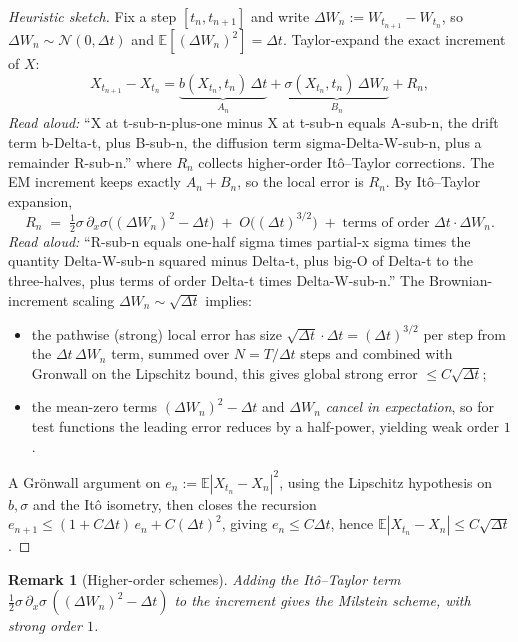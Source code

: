 \documentclass[11pt]{article}
\newtheorem{remark}{Remark}
\begin{document}
\begin{proof}[Heuristic sketch]
Fix a step $[t_n, t_{n+1}]$ and write $\Delta W_n := W_{t_{n+1}} - W_{t_n}$, so
$\Delta W_n \sim \mathcal{N}(0, \Delta t)$ and $\mathbb{E}[(\Delta W_n)^2] = \Delta t$.
Taylor-expand the exact increment of $X$:
\[
X_{t_{n+1}} - X_{t_n}
= \underbrace{b(X_{t_n}, t_n)\,\Delta t}_{A_n}
+ \underbrace{\sigma(X_{t_n}, t_n)\,\Delta W_n}_{B_n}
+ R_n,
\]
\emph{Read aloud:} ``X at t-sub-n-plus-one minus X at t-sub-n equals A-sub-n, the drift term b-Delta-t, plus B-sub-n, the diffusion term sigma-Delta-W-sub-n, plus a remainder R-sub-n.''
where $R_n$ collects higher-order It\^o--Taylor corrections. The EM increment
keeps exactly $A_n + B_n$, so the local error is $R_n$. By It\^o--Taylor expansion,
\[
R_n \;=\; \tfrac{1}{2}\sigma\,\partial_x\sigma \bigl((\Delta W_n)^2 - \Delta t\bigr)
\;+\; O\bigl((\Delta t)^{3/2}\bigr) \;+\; \text{terms of order } \Delta t \cdot \Delta W_n.
\]
\emph{Read aloud:} ``R-sub-n equals one-half sigma times partial-x sigma times the quantity Delta-W-sub-n squared minus Delta-t, plus big-O of Delta-t to the three-halves, plus terms of order Delta-t times Delta-W-sub-n.''
The Brownian-increment scaling $\Delta W_n \sim \sqrt{\Delta t}$ implies:
\begin{itemize}
\item the pathwise (strong) local error has size $\sqrt{\Delta t}\cdot\Delta t = (\Delta t)^{3/2}$
  per step from the $\Delta t\,\Delta W_n$ term, summed over $N = T/\Delta t$ steps and combined
  with Gronwall on the Lipschitz bound, this gives global strong error $\le C\sqrt{\Delta t}$;
\item the mean-zero terms $(\Delta W_n)^2 - \Delta t$ and $\Delta W_n$ \emph{cancel in expectation},
  so for test functions the leading error reduces by a half-power, yielding weak
  order $1$.
\end{itemize}
A Gr\"onwall argument on $e_n := \mathbb{E}|X_{t_n} - X_n|^2$, using the Lipschitz
hypothesis on $b,\sigma$ and the It\^o isometry, then closes the recursion
$e_{n+1} \le (1 + C\Delta t)\,e_n + C(\Delta t)^2$, giving $e_n \le C\Delta t$, hence
$\mathbb{E}|X_{t_n} - X_n| \le C\sqrt{\Delta t}$.
\end{proof}

\begin{remark}[Higher-order schemes]
Adding the It\^o--Taylor term $\tfrac{1}{2}\sigma\,\partial_x\sigma\,((\Delta W_n)^2 - \Delta t)$
to the increment gives the \emph{Milstein scheme}, with strong order $1$.
\end{remark}
\end{document}
